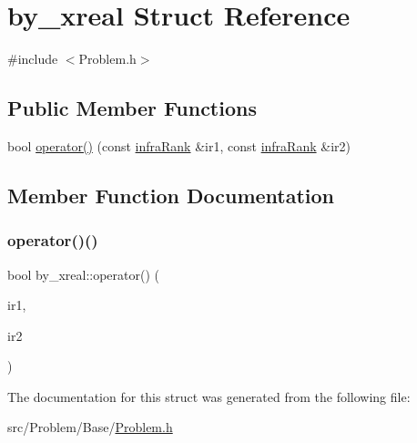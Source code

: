 \hypertarget{structby__xreal}{}\section{by\+\_\+xreal Struct Reference}
\label{structby__xreal}


{\ttfamily \#include $<$Problem.\+h$>$}

\subsection*{Public Member Functions}
\begin{DoxyCompactItemize}
\item 
bool \mbox{\hyperlink{structby__xreal_a89543fd1eb21d028c20e4cd01a239b71}{operator()}} (const \mbox{\hyperlink{structinfraRank}{infra\+Rank}} \&ir1, const \mbox{\hyperlink{structinfraRank}{infra\+Rank}} \&ir2)
\end{DoxyCompactItemize}


\subsection{Member Function Documentation}
\mbox{\label{structby__xreal_a89543fd1eb21d028c20e4cd01a239b71}} 
\subsubsection{\texorpdfstring{operator()()}{operator()()}}
{\footnotesize\ttfamily bool by\+\_\+xreal\+::operator() (\begin{DoxyParamCaption}\item[{const \mbox{\hyperlink{structinfraRank}{infra\+Rank}} \&}]{ir1,  }\item[{const \mbox{\hyperlink{structinfraRank}{infra\+Rank}} \&}]{ir2 }\end{DoxyParamCaption})\hspace{0.3cm}{\ttfamily [inline]}}



The documentation for this struct was generated from the following file\+:\begin{DoxyCompactItemize}
\item 
src/\+Problem/\+Base/\mbox{\hyperlink{Problem_8h}{Problem.\+h}}\end{DoxyCompactItemize}
